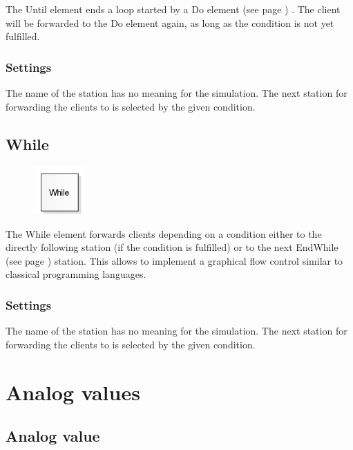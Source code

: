 The Until element ends a loop started by a
Do element (see page \pageref{ref:ModelElementLogicDo}) .
The client will be forwarded to the Do element again,
as long as the condition is not yet fulfilled.

\subsection*{Settings}

The name of the station has no meaning for the simulation.
The next station for forwarding the clients to is selected by the given condition.


\section{While}
\label{ref:ModelElementLogicWhile}

\begin{figure}
\vspace{-22pt}
\includegraphics[width=2cm]{imageModelElementLogicWhile.png}
\vspace{-22pt}
\end{figure}

The While element forwards clients depending on a condition either to the directly following station
(if the condition is fulfilled) or to the next EndWhile (see page \pageref{ref:ModelElementLogicEndWhile}) 
station. This allows to implement a graphical flow control similar to classical programming
languages.

\subsection*{Settings}

The name of the station has no meaning for the simulation.
The next station for forwarding the clients to is selected by the given condition.





\chapter{Analog values}

\section{Analog value}
\label{ref:ModelElementAnalogValue}

